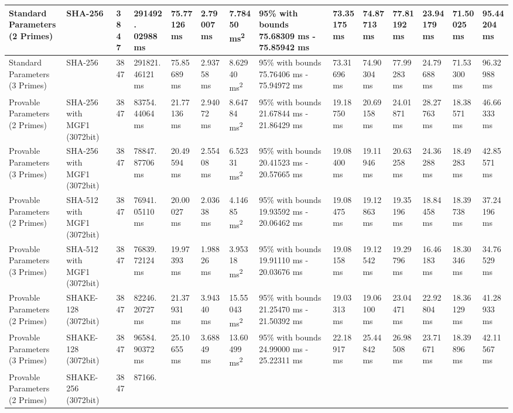 \documentclass[]{final_report}
\theoremstyle{definition}
\begin{document}
\begin{landscape}
\begin{longtable}{|p{2.3cm}|p{1.8cm}|p{1.0cm}|p{1.7cm}|p{1.4cm}|p{1.5cm}|p{1.8cm}|p{1.5cm}|p{1.43cm}|p{1.5cm}|p{1.3cm}|p{1.4cm}|p{1.3cm}|p{1.37cm}|}
\hline
\endlastfoot
Standard Parameters (2 Primes) & SHA-256 & 3847 & 291492.
02988 ms & 75.77126 ms & 2.79007 ms & 7.78450 ms\textsuperscript{2} & 95\% with bounds 75.68309 ms - 75.85942 ms & 73.35175 ms & 74.87713 ms & 77.81192 ms & 23.94179 ms & 71.50025 ms & 95.44204 ms \\
\hline
Standard Parameters (3 Primes) & SHA-256 & 3847 & 291821.
46121 ms & 75.85689 ms & 2.93758 ms & 8.62940 ms\textsuperscript{2} & 95\% with bounds 75.76406 ms - 75.94972 ms & 73.31696 ms & 74.90304 ms & 77.99283 ms & 24.79688 ms & 71.53300 ms & 96.32988 ms \\
\hline
Provable Parameters (2 Primes) & SHA-256 with MGF1 (3072bit) & 3847 & 83754.
44064 ms & 21.77136 ms & 2.94072 ms & 8.64784 ms\textsuperscript{2} & 95\% with bounds 21.67844 ms - 21.86429 ms & 19.18750 ms & 20.69158 ms & 24.01871 ms & 28.27763 ms & 18.38571 ms & 46.66333 ms \\
\hline
Provable Parameters (3 Primes) & SHA-256 with MGF1 (3072bit) & 3847 & 78847.
87706 ms & 20.49594 ms & 2.55408 ms & 6.52331 ms\textsuperscript{2} & 95\% with bounds 20.41523 ms - 20.57665 ms & 19.08400 ms & 19.11946 ms & 20.63258 ms & 24.36288 ms & 18.49283 ms & 42.85571 ms \\
\hline
Provable Parameters (2 Primes) & SHA-512 with MGF1 (3072bit) & 3847 & 76941.
05110 ms & 20.00027 ms & 2.03638 ms & 4.14685 ms\textsuperscript{2} & 95\% with bounds 19.93592 ms - 20.06462 ms & 19.08475 ms & 19.12863 ms & 19.35196 ms & 18.84458 ms & 18.39738 ms & 37.24196 ms \\
\hline
Provable Parameters (3 Primes) & SHA-512 with MGF1 (3072bit) & 3847 & 76839.
72124 ms & 19.97393 ms & 1.98826 ms & 3.95318 ms\textsuperscript{2} & 95\% with bounds 19.91110 ms - 20.03676 ms & 19.08158 ms & 19.12542 ms & 19.29796 ms & 16.46183 ms & 18.30346 ms & 34.76529 ms \\
\hline
Provable Parameters (2 Primes) & SHAKE-128 (3072bit) & 3847 & 82246.
20727 ms & 21.37931 ms & 3.94340 ms & 15.55043 ms\textsuperscript{2} & 95\% with bounds 21.25470 ms - 21.50392 ms & 19.03313 ms & 19.06100 ms & 23.04471 ms & 22.92804 ms & 18.36129 ms & 41.28933 ms \\
\hline
Provable Parameters (3 Primes) & SHAKE-128 (3072bit) & 3847 & 96584.
90372 ms & 25.10655 ms & 3.68849 ms & 13.60499 ms\textsuperscript{2} & 95\% with bounds 24.99000 ms - 25.22311 ms & 22.18917 ms & 25.44842 ms & 26.98508 ms & 23.71671 ms & 18.39896 ms & 42.11567 ms \\
\hline
Provable Parameters (2 Primes) & SHAKE-256 (3072bit) & 3847 & 87166.

\end{longtable}
\end{landscape}
\end{document}
